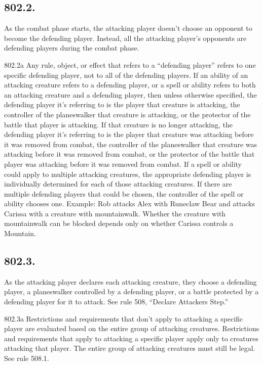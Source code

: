 \subsection*{802.2.}
As the combat phase starts, the attacking player doesn’t choose an opponent to become the defending player. Instead, all the attacking player’s opponents are defending players during the combat phase.

802.2a Any rule, object, or effect that refers to a “defending player” refers to one specific defending player, not to all of the defending players. If an ability of an attacking creature refers to a defending player, or a spell or ability refers to both an attacking creature and a defending player, then unless otherwise specified, the defending player it’s referring to is the player that creature is attacking, the controller of the planeswalker that creature is attacking, or the protector of the battle that player is attacking. If that creature is no longer attacking, the defending player it’s referring to is the player that creature was attacking before it was removed from combat, the controller of the planeswalker that creature was attacking before it was removed from combat, or the protector of the battle that player was attacking before it was removed from combat. If a spell or ability could apply to multiple attacking creatures, the appropriate defending player is individually determined for each of those attacking creatures. If there are multiple defending players that could be chosen, the controller of the spell or ability chooses one.
Example: Rob attacks Alex with Runeclaw Bear and attacks Carissa with a creature with mountainwalk. Whether the creature with mountainwalk can be blocked depends only on whether Carissa controls a Mountain.

\subsection*{802.3.}
As the attacking player declares each attacking creature, they choose a defending player, a planeswalker controlled by a defending player, or a battle protected by a defending player for it to attack. See rule 508, “Declare Attackers Step.”

802.3a Restrictions and requirements that don’t apply to attacking a specific player are evaluated based on the entire group of attacking creatures. Restrictions and requirements that apply to attacking a specific player apply only to creatures attacking that player. The entire group of attacking creatures must still be legal. See rule 508.1.

